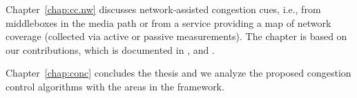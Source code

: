 
Chapter~\ref{chap:cc.nw} discusses network-assisted congestion cues, i.e.,
from middleboxes in the media path or from a service providing a map of
network coverage (collected via active or passive measurements). The chapter
is based on our contributions, which is documented in ,
 and \cite{glass:patent}.


Chapter~\ref{chap:conc} concludes the thesis and we analyze the proposed
congestion control algorithms with the areas in the framework.
